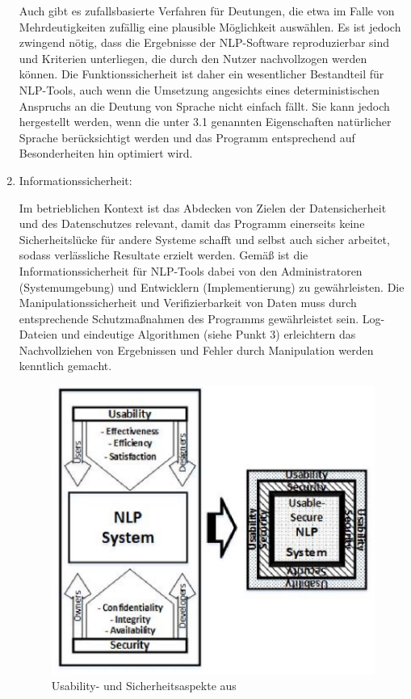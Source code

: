 \documentclass[12pt]{report}
\begin{document}
\begin{enumerate}
Auch gibt es zufallsbasierte Verfahren für Deutungen, die etwa im Falle von Mehrdeutigkeiten zufällig eine plausible Möglichkeit auswählen. Es ist jedoch zwingend nötig, dass die Ergebnisse der NLP-Software reproduzierbar sind und Kriterien unterliegen, die durch den Nutzer nachvollzogen werden können. Die Funktionssicherheit ist daher ein wesentlicher Bestandteil für NLP-Tools, auch wenn die Umsetzung angesichts eines deterministischen Anspruchs an die Deutung von Sprache nicht einfach fällt. Sie kann jedoch hergestellt werden, wenn die unter 3.1 genannten Eigenschaften natürlicher Sprache berücksichtigt werden und das Programm entsprechend auf Besonderheiten hin optimiert wird.

\item Informationssicherheit:

Im betrieblichen Kontext ist das Abdecken von Zielen der Datensicherheit und des Datenschutzes relevant, damit das Programm einerseits keine Sicherheitslücke für andere Systeme schafft und selbst auch sicher arbeitet, sodass verlässliche Resultate erzielt werden. Gemäß \cite{hl13} ist die Informationssicherheit für NLP-Tools dabei von den Administratoren (Systemumgebung) und Entwicklern (Implementierung) zu gewährleisten. Die Manipulationssicherheit und Verifizierbarkeit von Daten muss durch entsprechende Schutzmaßnahmen des Programms gewährleistet sein. Log-Dateien und eindeutige Algorithmen (siehe Punkt 3) erleichtern das Nachvollziehen von Ergebnissen und Fehler durch Manipulation werden kenntlich gemacht. 

\begin{figure}[h!]
\begin{center}
\includegraphics[scale=0.5]{GATE_Bilder/NLPSystem.jpg}
\caption{Usability- und Sicherheitsaspekte aus \cite{hl13}}
\end{center}
\end{figure} 


\end{enumerate}
\end{document}
